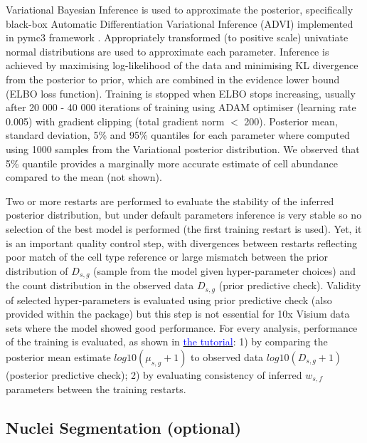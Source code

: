\documentclass[11pt,a4paper]{article}
\newcommand{\blue}{\textcolor{blue}}
\begin{document}
Variational Bayesian Inference is used to approximate the posterior, specifically black-box Automatic Differentiation Variational Inference (ADVI) implemented in pymc3 framework \autocite{salvatier_probabilistic_2016}. Appropriately transformed (to positive scale) univatiate normal distributions are used to approximate each parameter. Inference is achieved by maximising log-likelihood of the data and minimising KL divergence from the posterior to prior, which are combined in the evidence lower bound (ELBO loss function). Training is stopped when ELBO stops increasing, usually after 20 000 - 40 000 iterations of training using ADAM optimiser (learning rate 0.005) with gradient clipping (total gradient norm $<$ 200). Posterior mean, standard deviation, 5\% and 95\% quantiles for each parameter where computed using 1000 samples from the Variational posterior distribution. We observed that 5\% quantile provides a marginally more accurate estimate of cell abundance compared to the mean (not shown). 


Two or more restarts are performed to evaluate the stability of the inferred posterior distribution, but under default parameters inference is very stable so no selection of the best model is performed (the first training restart is used). Yet, it is an important quality control step, with divergences between restarts reflecting poor match of the cell type reference or large mismatch between the prior distribution of $D_{s,g}$ (sample from the model given hyper-parameter choices) and the count distribution in the observed data $D_{s,g}$ (prior predictive check). Validity of selected hyper-parameters is evaluated using prior predictive check (also provided within the package) but this step is not essential for 10x Visium data sets where the model showed good performance. For every analysis, performance of the training is evaluated, as shown in \href{https://cell2location.readthedocs.io/en/latest/notebooks/cell2location_short_demo.html#Evaluating-training}{\blue{the tutorial}}: 1) by comparing the posterior mean estimate $log10(\mu_{s,g} + 1)$ to observed data $log10(D_{s,g} + 1)$ (posterior predictive check); 2) by evaluating consistency of inferred $w_{s,f}$ parameters between the training restarts.

\subsection{Nuclei Segmentation (optional)} \label{c2l_segmentation}
\end{document}
